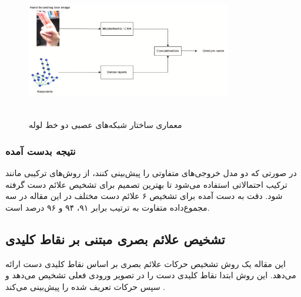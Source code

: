 \begin{figure}[h]
    \centering
    \includegraphics[height=6cm,width=0.8\textwidth]{keypoints_boundingBox.png}
    \caption[معماری ساختار شبکه‌های عصبی دو خط لوله]{معماری ساختار شبکه‌های عصبی دو خط لوله\cite{dang2022improved}}
\end{figure}


\subsubsection{نتیجه بدست آمده}
در صورتی که دو مدل خروجی‌های متفاوتی را پیش‌بینی کنند، از روش‌های ترکیبی مانند ترکیب احتمالاتی استفاده می‌شود تا بهترین تصمیم برای تشخیص علائم دست گرفته شود.
دقت به دست آمده برای تشخیص ۶ علائم دست مختلف در این مقاله در سه مجموع‌داده متفاوت به ترتیب برابر ۹۱، ۹۴ و ۹۶ درصد است.




\subsection{تشخيص علائم بصری مبتنی بر نقاط کلیدی}
این مقاله یک روش تشخیص حرکات علائم بصری بر اساس نقاط کلیدی دست ارائه می‌دهد. این روش ابتدا نقاط کلیدی دست را در تصویر ورودی فعلی تشخیص می‌دهد و سپس حرکات تعریف شده را پیش‌بینی می‌کند \cite{chen2021visual}.

